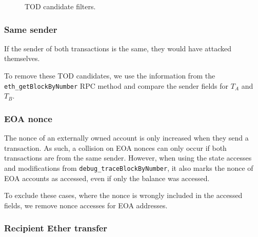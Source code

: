 \documentclass[draft,final]{vutinfth} %
\begin{document}
\begin{figure}[h]
    \centering
    \caption{TOD candidate filters.}
    \label{fig:tod_candidate_dependency}
\end{figure}

\subsubsection{Same sender}

If the sender of both transactions is the same, they would have attacked themselves.

To remove these TOD candidates, we use the information from the \verb|eth_getBlockByNumber| RPC method and compare the sender fields for $T_A$ and $T_B$.

\subsubsection{EOA nonce}


The nonce of an externally owned account is only increased when they send a transaction. As such, a collision on EOA nonces can only occur if both transactions are from the same sender. However, when using the state accesses and modifications from \verb|debug_traceBlockByNumber|, it also marks the nonce of EOA accounts as accessed, even if only the balance was accessed.

To exclude these cases, where the nonce is wrongly included in the accessed fields, we remove nonce accesses for EOA addresses.

\subsubsection{Recipient Ether transfer}
\end{document}
